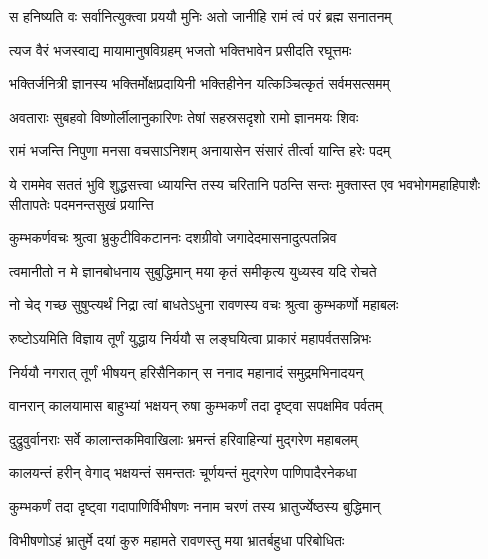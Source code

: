 \twolineshloka
{स हनिष्यति वः सर्वानित्युक्त्वा प्रययौ मुनिः}
{अतो जानीहि रामं त्वं परं ब्रह्म सनातनम्} %

\twolineshloka
{त्यज वैरं भजस्वाद्य मायामानुषविग्रहम्}
{भजतो भक्तिभावेन प्रसीदति रघूत्तमः} %

\twolineshloka
{भक्तिर्जनित्री ज्ञानस्य भक्तिर्मोक्षप्रदायिनी}
{भक्तिहीनेन यत्किञ्चित्कृतं सर्वमसत्समम्} %

\twolineshloka
{अवताराः सुबहवो विष्णोर्लीलानुकारिणः}
{तेषां सहस्रसदृशो रामो ज्ञानमयः शिवः} %

\twolineshloka
{रामं भजन्ति निपुणा मनसा वचसाऽनिशम्}
{अनायासेन संसारं तीर्त्वा यान्ति हरेः पदम्} %

\fourlineindentedshloka
{ये राममेव सततं भुवि शुद्धसत्त्वा}
{ध्यायन्ति तस्य चरितानि पठन्ति सन्तः}
{मुक्तास्त एव भवभोगमहाहिपाशैः}
{सीतापतेः पदमनन्तसुखं प्रयान्ति} %






\twolineshloka
{कुम्भकर्णवचः श्रुत्वा भ्रुकुटीविकटाननः}
{दशग्रीवो जगादेदमासनादुत्पतन्निव} %

\twolineshloka
{त्वमानीतो न मे ज्ञानबोधनाय सुबुद्धिमान्}
{मया कृतं समीकृत्य युध्यस्व यदि रोचते} %

\twolineshloka
{नो चेद् गच्छ सुषुप्त्यर्थं निद्रा त्वां बाधतेऽधुना}
{रावणस्य वचः श्रुत्वा कुम्भकर्णो महाबलः} %

\twolineshloka
{रुष्टोऽयमिति विज्ञाय तूर्णं युद्धाय निर्ययौ}
{स लङ्घयित्वा प्राकारं महापर्वतसन्निभः} %

\twolineshloka
{निर्ययौ नगरात् तूर्णं भीषयन् हरिसैनिकान्}
{स ननाद महानादं समुद्रमभिनादयन्} %

\twolineshloka
{वानरान् कालयामास बाहुभ्यां भक्षयन् रुषा}
{कुम्भकर्णं तदा दृष्ट्वा सपक्षमिव पर्वतम्} %

\twolineshloka
{दुद्रुवुर्वानराः सर्वे कालान्तकमिवाखिलाः}
{भ्रमन्तं हरिवाहिन्यां मुद्गरेण महाबलम्} %

\twolineshloka
{कालयन्तं हरीन् वेगाद् भक्षयन्तं समन्ततः}
{चूर्णयन्तं मुद्गरेण पाणिपादैरनेकधा} %

\twolineshloka
{कुम्भकर्णं तदा दृष्ट्वा गदापाणिर्विभीषणः}
{ननाम चरणं तस्य भ्रातुर्ज्येष्ठस्य बुद्धिमान्} %

\twolineshloka
{विभीषणोऽहं भ्रातुर्मे दयां कुरु महामते}
{रावणस्तु मया भ्रातर्बहुधा परिबोधितः} %

